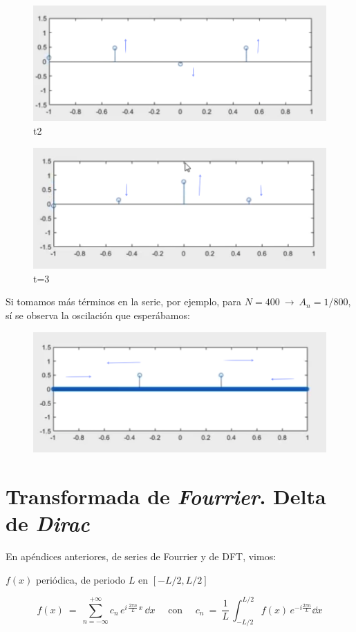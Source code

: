 \begin{example}
\begin{multicols}{2}
\begin{figure}[H]
	\centering
	\includegraphics[width=.45\textwidth]{imagenes/apendices-DFT10.png}
	\caption*{t2}
\end{figure}	
\begin{figure}[H]
	\centering
	\includegraphics[width=.45\textwidth]{imagenes/apendices-DFT11.png}
	\caption*{t=3}
\end{figure}	
\end{multicols}

Si tomamos más términos en la serie, por ejemplo, para $N=400 \ \to \ A_n=1/800$, sí se  observa la oscilación que esperábamos:

\begin{figure}[H]
	\centering
	\includegraphics[width=.5\textwidth]{imagenes/apendices-DFT13.png}
\end{figure}
\vspace{3mm}
\end{example}




\chapter{Transformada de \emph{Fourrier}. Delta de 	\emph{Dirac}}
\label{ap-TF}

En apéndices anteriores, de series de Fourrier y de DFT, vimos:

$f(x)$ periódica, de periodo $L$ en $[-L/2,L/2]$

$$f(x) \ = \ \displaystyle \sum_{n=-\infty}^{+\infty} c_n\, e^{i\, \frac{2\pi n}{L}\, x}\, \dd x \quad \text{ con } \quad c_n \ = \ \dfrac 1 L \, \int_{-L/2}^{L/2} f(x)\, e^{-i \frac{2\pi n}{L}} \dd x$$ 

